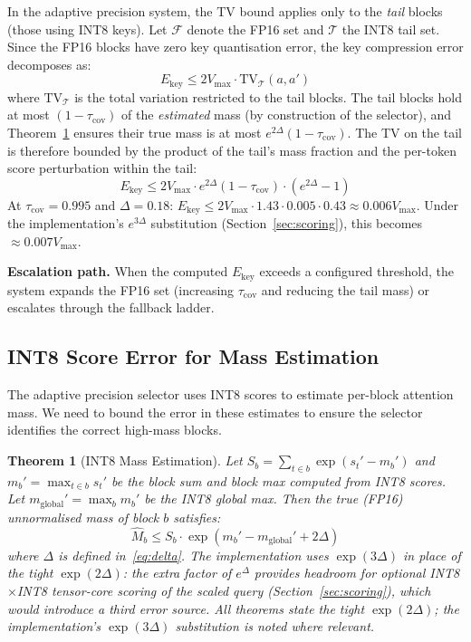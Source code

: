 \documentclass[11pt,a4paper]{article}
\newtheorem{theorem}{Theorem}[section]
\theoremstyle{definition}
\theoremstyle{remark}
\begin{document}
In the adaptive precision system, the TV bound applies only to the \emph{tail} blocks (those using INT8 keys).  Let $\mathcal{F}$ denote the FP16 set and $\mathcal{T}$ the INT8 tail set.  Since the FP16 blocks have zero key quantisation error, the key compression error decomposes as:
\begin{equation}
  E_{\mathrm{key}} \leq 2 V_{\max} \cdot \mathrm{TV}_{\mathcal{T}}(a, a')
\end{equation}
where $\mathrm{TV}_{\mathcal{T}}$ is the total variation restricted to the tail blocks.  The tail blocks hold at most $(1 - \tau_{\mathrm{cov}})$ of the \emph{estimated} mass (by construction of the selector), and Theorem~\ref{thm:mass} ensures their true mass is at most $e^{2\Delta}(1 - \tau_{\mathrm{cov}})$.  The TV on the tail is therefore bounded by the product of the tail's mass fraction and the per-token score perturbation within the tail:
\begin{equation}
  E_{\mathrm{key}} \leq 2 V_{\max} \cdot e^{2\Delta} (1 - \tau_{\mathrm{cov}}) \cdot (e^{2\Delta} - 1)
\end{equation}
At $\tau_{\mathrm{cov}} = 0.995$ and $\Delta = 0.18$: $E_{\mathrm{key}} \leq 2 V_{\max} \cdot 1.43 \cdot 0.005 \cdot 0.43 \approx 0.006 V_{\max}$.  Under the implementation's $e^{3\Delta}$ substitution (Section~\ref{sec:scoring}), this becomes $\approx 0.007 V_{\max}$.

\textbf{Escalation path.}  When the computed $E_{\mathrm{key}}$ exceeds a configured threshold, the system expands the FP16 set (increasing $\tau_{\mathrm{cov}}$ and reducing the tail mass) or escalates through the fallback ladder.

\subsection{INT8 Score Error for Mass Estimation}
\label{sec:score_error}

The adaptive precision selector uses INT8 scores to estimate per-block attention mass.  We need to bound the error in these estimates to ensure the selector identifies the correct high-mass blocks.

\begin{theorem}[INT8 Mass Estimation]
\label{thm:mass}
Let $S_b = \sum_{t \in b} \exp(s_t' - m_b')$ and $m_b' = \max_{t \in b} s_t'$ be the block sum and block max computed from INT8 scores.  Let $m_{\mathrm{global}}' = \max_b m_b'$ be the INT8 global max.  Then the true (FP16) unnormalised mass of block $b$ satisfies:
\begin{equation}
\label{eq:mass_bound}
  \hat{M}_b \leq S_b \cdot \exp(m_b' - m_{\mathrm{global}}' + 2\Delta)
\end{equation}
where $\Delta$ is defined in~\eqref{eq:delta}.  The implementation uses $\exp(3\Delta)$ in place of the tight $\exp(2\Delta)$: the extra factor of $e^{\Delta}$ provides headroom for optional INT8$\times$INT8 tensor-core scoring of the scaled query (Section~\ref{sec:scoring}), which would introduce a third error source.  All theorems state the tight $\exp(2\Delta)$; the implementation's $\exp(3\Delta)$ substitution is noted where relevant.
\end{theorem}
\end{document}
